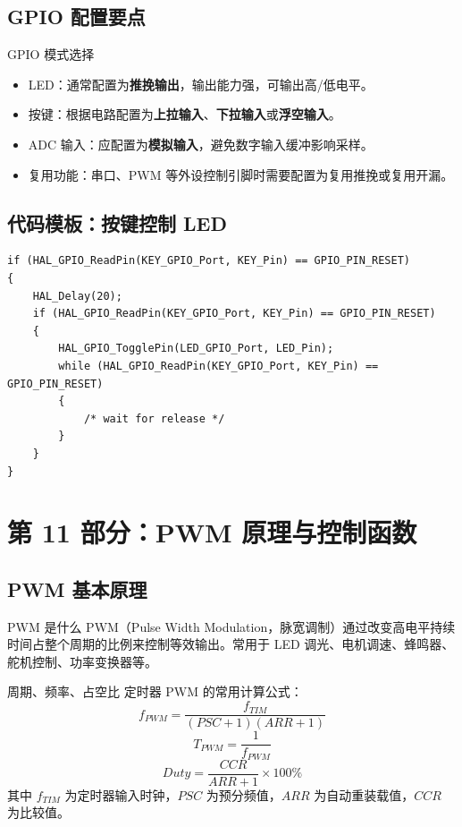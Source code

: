 \documentclass[UTF8,fontset=none,12pt]{ctexart}
\begin{document}
\subsection{GPIO 配置要点}
\begin{pointbox}{GPIO 模式选择}
\begin{itemize}
  \item LED：通常配置为\textbf{推挽输出}，输出能力强，可输出高/低电平。
  \item 按键：根据电路配置为\textbf{上拉输入}、\textbf{下拉输入}或\textbf{浮空输入}。
  \item ADC 输入：应配置为\textbf{模拟输入}，避免数字输入缓冲影响采样。
  \item 复用功能：串口、PWM 等外设控制引脚时需要配置为复用推挽或复用开漏。
\end{itemize}
\end{pointbox}

\subsection{代码模板：按键控制 LED}
\begin{lstlisting}[style=cstyle]
if (HAL_GPIO_ReadPin(KEY_GPIO_Port, KEY_Pin) == GPIO_PIN_RESET)
{
    HAL_Delay(20);
    if (HAL_GPIO_ReadPin(KEY_GPIO_Port, KEY_Pin) == GPIO_PIN_RESET)
    {
        HAL_GPIO_TogglePin(LED_GPIO_Port, LED_Pin);
        while (HAL_GPIO_ReadPin(KEY_GPIO_Port, KEY_Pin) == GPIO_PIN_RESET)
        {
            /* wait for release */
        }
    }
}
\end{lstlisting}

\section{第 11 部分：PWM 原理与控制函数}

\subsection{PWM 基本原理}
\begin{pointbox}{PWM 是什么}
PWM（Pulse Width Modulation，脉宽调制）通过改变高电平持续时间占整个周期的比例来控制等效输出。常用于 LED 调光、电机调速、蜂鸣器、舵机控制、功率变换器等。
\end{pointbox}

\begin{pointbox}{周期、频率、占空比}
定时器 PWM 的常用计算公式：
\[
  f_{PWM}=\frac{f_{TIM}}{(PSC+1)(ARR+1)}
\]
\[
  T_{PWM}=\frac{1}{f_{PWM}}
\]
\[
  Duty=\frac{CCR}{ARR+1}\times 100\% 
\]
其中 $f_{TIM}$ 为定时器输入时钟，$PSC$ 为预分频值，$ARR$ 为自动重装载值，$CCR$ 为比较值。
\end{pointbox}
\end{document}
